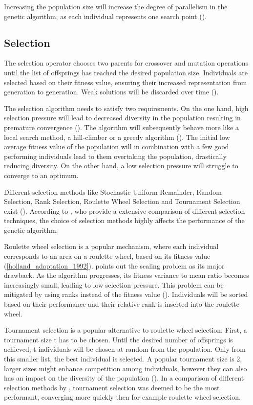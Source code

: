 Increasing the population size will increase the degree of parallelism in the genetic algorithm, as each individual represents one search point (\cite{mills_determining_2015}).

\subsection{Selection}
The selection operator chooses two parents for crossover and mutation operations until the list of offsprings has reached the desired population size. 
Individuals are selected based on their fitness value, ensuring their increased representation from generation to generation. Weak solutions will be discarded over time (\cite{srinivas_genetic_1994}).

The selection algorithm needs to satisfy two requirements. 
On the one hand, high selection pressure will lead to decreased diversity in the population resulting in premature convergence (\cite{katoch_review_2021}). The algorithm will subsequently behave more like a local search method, a hill-climber or a greedy algorithm (\cite{kacprzyk_parameter_2007}). The initial low average fitness value of the population will in combination with a few good performing individuals lead to them overtaking the population, drastically reducing diversity.
On the other hand, a low selection pressure will struggle to converge to an optimum.

Different selection methods like Stochastic Uniform Remainder, Random Selection, Rank Selection, Roulette Wheel Selection and Tournament Selection exist (\cite{majumdar_genetic_2015}). According to \cite{hussain_trade-off_2020}, who provide a extensive comparison of different selection techniques, the choice of selection methods highly affects the performance of the genetic algorithm.

Roulette wheel selection is a popular mechanism, where each individual corresponds to an area on a roulette wheel, based on its fitness value (\ref{holland_adaptation_1992}). \cite{grefenstette_optimization_1986} points out the scaling problem as its major drawback. As the algorithm progresses, its fitness variance to mean ratio becomes increasingly small, leading to low selection pressure.
This problem can be mitigated by using ranks instead of the fitness value (\cite{katoch_review_2021}). Individuals will be sorted based on their performance and their relative rank is inserted into the roulette wheel. 

Tournament selection is a popular alternative to roulette wheel selection. First, a tournament size t has to be chosen. Until the desired number of offsprings is achieved, t individuals will be chosen at random from the population. Only from this smaller list, the best individual is selected. A popular tournament size is 2, larger sizes might enhance competition among individuals, however they can also has an impact on the diversity of the population (\cite{hussain_trade-off_2020}). In a comparison of different selection methods by \cite{jinghui_zhong_comparison_2005}, tournament selection was deemed to be the most performant, converging more quickly then for example roulette wheel selection.

